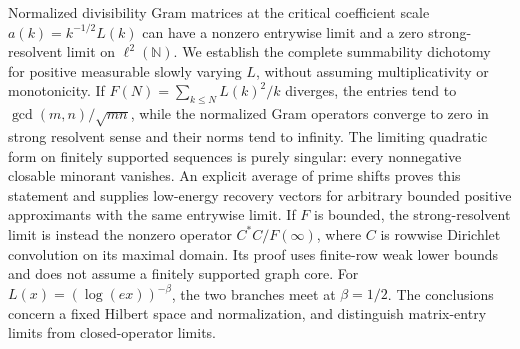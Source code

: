 Normalized divisibility Gram matrices at the critical coefficient scale
$a(k)=k^{-1/2}L(k)$ can have a nonzero entrywise limit and a zero
strong-resolvent limit on $\ell^2(\mathbb N)$. We establish the complete
summability dichotomy for positive measurable slowly varying $L$, without
assuming multiplicativity or monotonicity. If
$F(N)=\sum_{k\le N}L(k)^2/k$ diverges, the entries tend to
$\gcd(m,n)/\sqrt{mn}$, while the normalized Gram operators converge to zero
in strong resolvent sense and their norms tend to infinity. The limiting
quadratic form on finitely supported sequences is purely singular: every
nonnegative closable minorant vanishes. An explicit average of prime shifts
proves this statement and supplies low-energy recovery vectors for arbitrary
bounded positive approximants with the same entrywise limit. If $F$ is
bounded, the strong-resolvent limit is instead the nonzero operator
$C^*C/F(\infty)$, where $C$ is rowwise Dirichlet convolution on its maximal
domain. Its proof uses finite-row weak lower bounds and does not assume a
finitely supported graph core. For
$L(x)=(\log(ex))^{-\beta}$, the two branches meet at $\beta=1/2$.
The conclusions concern a fixed Hilbert space and normalization, and
distinguish matrix-entry limits from closed-operator limits.
